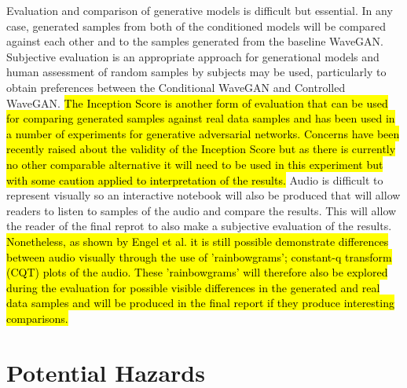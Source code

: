\documentclass[titlepage]{article}
\begin{document}
Evaluation and comparison of generative models is difficult but essential.
In any case, generated samples from both of the conditioned models will be compared against each other and to the samples generated from the baseline WaveGAN.
\newline
\newline
Subjective evaluation is an appropriate approach for generational models and human assessment of random samples by subjects may be used, particularly to obtain preferences between the Conditional WaveGAN and Controlled WaveGAN.
\newline
\newline
{}
\hl{
  The Inception Score is another form of evaluation that can be used for comparing generated samples against real data samples and has been used in a number of experiments for generative adversarial networks.
  Concerns have been recently raised about the validity of the Inception Score but as there is currently no other comparable alternative it will need to be used in this experiment but with some caution applied to interpretation of the results.
}
\newline
\newline
Audio is difficult to represent visually so an interactive notebook will also be produced that will allow readers to listen to samples of the audio and compare the results.
This will allow the reader of the final reprot to also make a subjective evaluation of the results.
\hl{
  Nonetheless, as shown by Engel et al. it is still possible demonstrate differences between audio visually through the use of 'rainbowgrams'; constant-q transform (CQT) plots of the audio.
  These 'rainbowgrams' will therefore also be explored during the evaluation for possible visible differences in the generated and real data samples and will be produced in the final report if they produce interesting comparisons.
}

\section{Potential Hazards}
\end{document}
